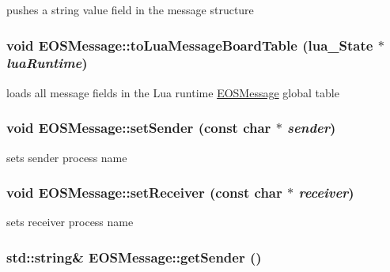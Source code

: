 pushes a string value field in the message structure 

\hypertarget{classEOSMessage_2acc24a0b1bd887a34357057a0678537}{
\subsubsection[{toLuaMessageBoardTable}]{\setlength{\rightskip}{0pt plus 5cm}void EOSMessage::toLuaMessageBoardTable (lua\_\-State $\ast$ {\em luaRuntime})}}
\label{classEOSMessage_2acc24a0b1bd887a34357057a0678537}


loads all message fields in the Lua runtime \hyperlink{classEOSMessage}{EOSMessage} global table 

\hypertarget{classEOSMessage_fee56421daea7a52d9c9bfccb95e92ee}{
\subsubsection[{setSender}]{\setlength{\rightskip}{0pt plus 5cm}void EOSMessage::setSender (const char $\ast$ {\em sender})}}
\label{classEOSMessage_fee56421daea7a52d9c9bfccb95e92ee}


sets sender process name 

\hypertarget{classEOSMessage_cd7733e73deb926208b222b7f7c50d4d}{
\subsubsection[{setReceiver}]{\setlength{\rightskip}{0pt plus 5cm}void EOSMessage::setReceiver (const char $\ast$ {\em receiver})}}
\label{classEOSMessage_cd7733e73deb926208b222b7f7c50d4d}


sets receiver process name 

\hypertarget{classEOSMessage_1d5409e96cc5af7426f36b4e7e90e745}{
\subsubsection[{getSender}]{\setlength{\rightskip}{0pt plus 5cm}std::string\& EOSMessage::getSender ()}}
\label{classEOSMessage_1d5409e96cc5af7426f36b4e7e90e745}


